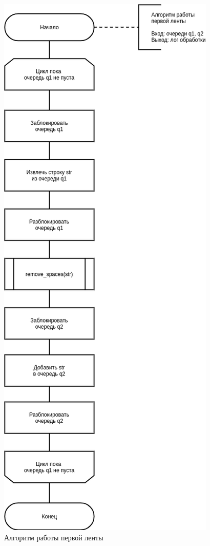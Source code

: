 \begin{figure}[H]
	\begin{center}
		\includegraphics[scale=0.5]{img/first.png}
	\end{center}
	\captionsetup{justification=centering}
	\caption{Алгоритм работы первой ленты}
	\label{img:first}
\end{figure}

